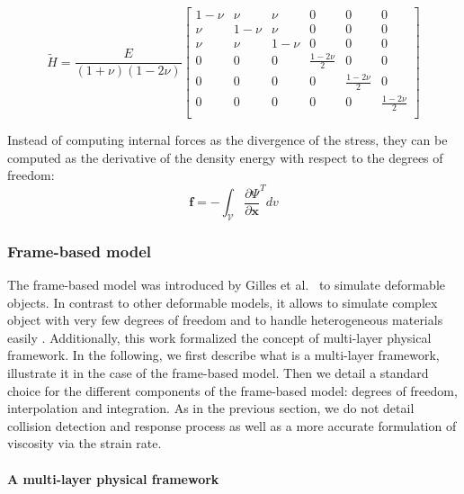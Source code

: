 \begin{equation}
\tilde{H} =
\frac{E}{\left(1+\nu\right)\left(1-2\nu\right)}
\begin{bmatrix}
1-\nu & \nu & \nu & 0 & 0 & 0 \\ 
\nu & 1-\nu & \nu & 0 & 0 & 0 \\
\nu & \nu & 1-\nu & 0 & 0 & 0 \\
0 & 0 & 0 & \frac{1-2\nu}{2} & 0 & 0 \\
0 & 0 & 0 & 0 & \frac{1-2\nu}{2} & 0 \\
0 & 0 & 0 & 0 & 0 & \frac{1-2\nu}{2} \\
\end{bmatrix}
\end{equation}

Instead of computing internal forces as the divergence of the stress, they can be computed as the derivative of the density energy with respect to the degrees of freedom:
\begin{equation}
\label{eq:internalForces}
\mathbf{f} = -\int_{\mathcal{V}} \frac{\partial \Psi}{\partial \mathbf{x}}^{T} dv
\end{equation}

\subsubsection{Frame-based model}

The frame-based model was introduced by Gilles et al.~\cite{Gilles2011} to simulate deformable objects. In contrast to other deformable models, it allows to simulate complex object with very few degrees of freedom and to handle heterogeneous materials easily \cite{Faure2011}. Additionally, this work formalized the concept of multi-layer physical framework. In the following, we first describe what is a multi-layer framework, illustrate it in the case of the frame-based model. Then we detail a standard choice for the different components of the frame-based model: degrees of freedom, interpolation and integration. As in the previous section, we do not detail collision detection and response process as well as a more accurate formulation of viscosity via the strain rate.

\paragraph{A multi-layer physical framework}
 
